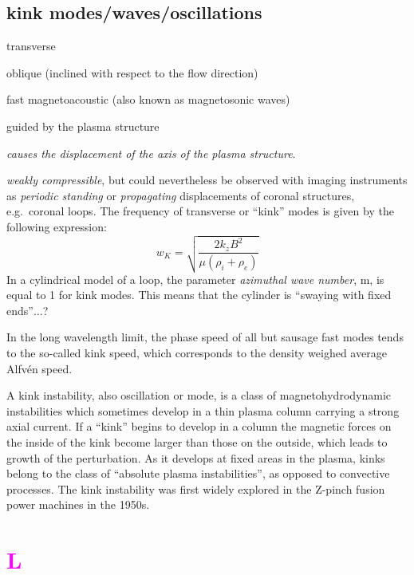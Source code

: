 \documentclass[12pt]{article}
\begin{document}
\subsection*{kink modes/waves/oscillations}
\begin{itemize*}
    \item transverse
    \item oblique (inclined with respect to the flow direction)
    \item fast magnetoacoustic (also known as magnetosonic waves)
    \item guided by the plasma structure
    \item \emph{causes the displacement of the axis of the plasma structure}.
    \item \emph{weakly compressible}, but could nevertheless be
        observed with imaging instruments as \emph{periodic standing}
        or \emph{propagating} displacements of coronal structures, e.g.\ coronal loops.
        The frequency of transverse or ``kink'' modes is given by the following expression:
            $$ w_K = \sqrt{ \frac{2k_zB^2}{\mu(\rho_i+\rho_e)}  }   $$
        In a cylindrical model of a loop,
        the parameter \emph{azimuthal wave number},
        m, is equal to 1 for kink modes.
        This means that the cylinder is ``swaying with fixed ends''$\ldots$?
    \item In the long wavelength limit, the phase speed of all but
        sausage fast modes tends to the so-called kink speed,
        which corresponds to the density weighed average Alfv\'en speed.
    \item A kink instability, also oscillation or mode, is a class
        of magnetohydrodynamic instabilities which sometimes develop
        in a thin plasma column carrying a strong axial current.
        If a ``kink'' begins to develop in a column the magnetic forces
        on the inside of the kink become larger than those on the
        outside, which leads to growth of the perturbation.
        As it develops at fixed areas in the plasma,
        kinks belong to the class of ``absolute plasma instabilities'',
        as opposed to convective processes.
        The kink instability was first widely explored in
        the Z-pinch fusion power machines in the 1950s.
\end{itemize*}

\section*{\textcolor{magenta}{L}}
\end{document}
